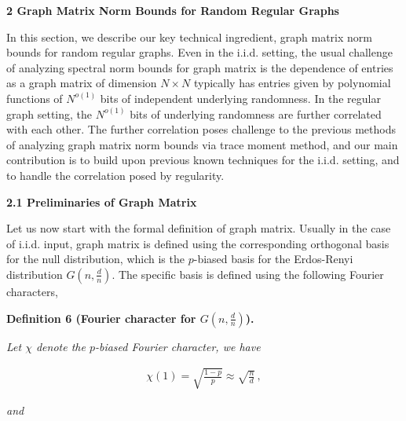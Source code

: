 \par\medskip\noindent\textbf{
2 Graph Matrix Norm Bounds for Random Regular Graphs}\par




In this section, we describe our key technical ingredient, graph matrix norm bounds for random regular graphs. Even in the i.i.d. setting, the usual challenge of analyzing spectral norm bounds for graph matrix is the dependence of entries as a graph matrix of dimension $N\times N$ typically has entries given by polynomial functions of $N^{o(1)}$ bits of independent underlying randomness. In the regular graph setting, the $N^{o(1)}$ bits of underlying randomness are further correlated with each other. The further correlation poses challenge to the previous methods of analyzing graph matrix norm bounds via trace moment method, and our main contribution is to build upon previous known techniques for the i.i.d. setting, and to handle the correlation posed by regularity.\par




\par\medskip\noindent\textbf{
2.1 Preliminaries of Graph Matrix}\par




Let us now start with the formal definition of graph matrix. Usually in the case of i.i.d. input, graph matrix is defined using the corresponding orthogonal basis for the null distribution, which is the $p$-biased basis for the Erdos-Renyi distribution $G(n,\frac{d}{n})$. The specific basis is defined using the following Fourier characters,\par





\par\medskip\noindent\textbf{
\textbf{Definition 6}\textbf{ }(Fourier character for $G(n,\frac{d}{n})$)\textbf{.}
}\par



\emph{Let $\chi$ denote the $p$-biased Fourier character, we have}\par


\[\begin{gathered}
\chi(1)=\sqrt{\frac{1-p}{p}}\approx\sqrt{\frac{n}{d}}\,,
\end{gathered}\]


\emph{and}\par


